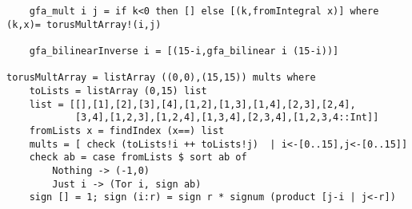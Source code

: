 \begin{lstlisting}
	gfa_mult i j = if k<0 then [] else [(k,fromIntegral x)] where (k,x)= torusMultArray!(i,j)
	
	gfa_bilinearInverse i = [(15-i,gfa_bilinear i (15-i))]

torusMultArray = listArray ((0,0),(15,15)) mults where  
	toLists = listArray (0,15) list
	list = [[],[1],[2],[3],[4],[1,2],[1,3],[1,4],[2,3],[2,4],
			[3,4],[1,2,3],[1,2,4],[1,3,4],[2,3,4],[1,2,3,4::Int]]
	fromLists x = findIndex (x==) list
	mults = [ check (toLists!i ++ toLists!j)  | i<-[0..15],j<-[0..15]]
	check ab = case fromLists $ sort ab of
		Nothing -> (-1,0)
		Just i -> (Tor i, sign ab)
	sign [] = 1; sign (i:r) = sign r * signum (product [j-i | j<-r])
\end{lstlisting}

